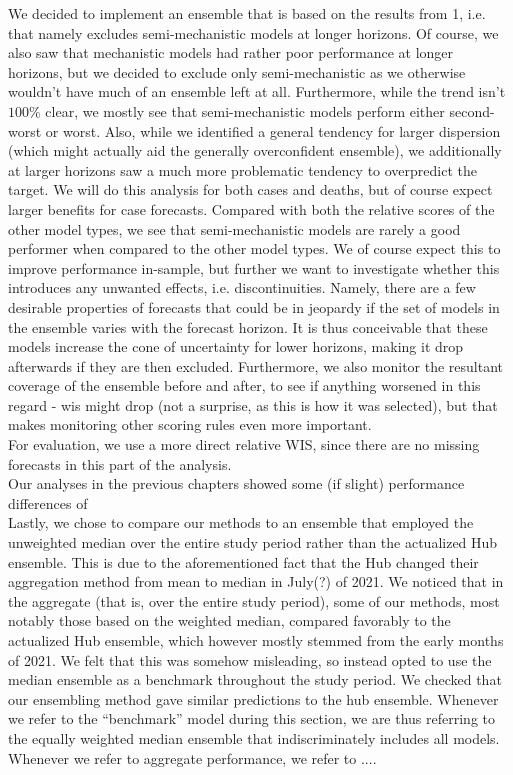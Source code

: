 We decided to implement an ensemble that is based on the results from 1, i.e. that namely excludes semi-mechanistic models at longer horizons. Of course, we also saw that mechanistic models had rather poor performance at longer horizons, but we decided to exclude only semi-mechanistic as we otherwise wouldn't have much of an ensemble left at all. Furthermore, while the trend isn't $100\%$ clear, we mostly see that semi-mechanistic models perform either second-worst or worst. Also, while we identified a general tendency for larger dispersion (which might actually aid the generally overconfident ensemble), we additionally at larger horizons saw a much more problematic tendency to overpredict the target. We will do this analysis for both cases and deaths, but of course expect larger benefits for case forecasts. Compared with both the relative scores of the other model types, we see that semi-mechanistic models are rarely a good performer when compared to the other model types.  We of course expect this to improve performance in-sample, but further we want to investigate whether this introduces any unwanted effects, i.e. discontinuities. Namely, there are a few desirable properties of forecasts that could be in jeopardy if the set of models in the ensemble varies with the forecast horizon. It is thus conceivable that these models increase the cone of uncertainty for lower horizons, making it drop afterwards if they are then excluded. Furthermore, we also monitor the resultant coverage of the ensemble before and after, to see if anything worsened in this regard - wis might drop (not a surprise, as this is how it was selected), but that makes monitoring other scoring rules even more important. \\
For evaluation, we use a more direct relative WIS, since there are no missing forecasts in this part of the analysis.\\
Our analyses in the previous chapters showed some (if slight) performance differences of  \\
Lastly, we chose to compare our methods to an ensemble that employed the unweighted median over the entire study period rather than the actualized Hub ensemble. This is due to the aforementioned fact that the Hub changed their aggregation method from mean to median in July(?) of 2021. We noticed that in the aggregate (that is, over the entire study period), some of our methods, most notably those based on the weighted median, compared favorably to the actualized Hub ensemble, which however mostly stemmed from the early months of 2021. We felt that this was somehow misleading, so instead opted to use the median ensemble as a benchmark throughout the study period. We checked that our ensembling method gave similar predictions to the hub ensemble. Whenever we refer to the ``benchmark'' model during this section, we are thus referring to the equally weighted median ensemble that indiscriminately includes all models. Whenever we refer to aggregate performance, we refer to .... \\

